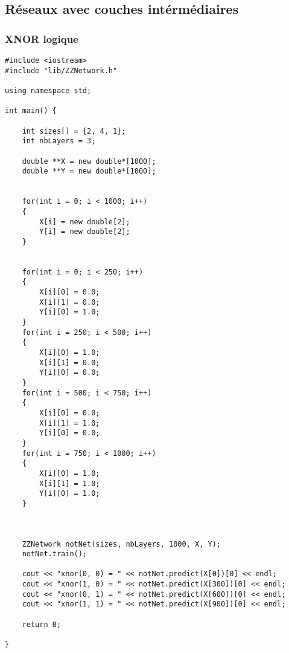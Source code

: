 \subsection{Réseaux avec couches intérmédiaires}

\subsubsection{XNOR logique}
\begin{verbatim}
#include <iostream>
#include "lib/ZZNetwork.h"

using namespace std;

int main() {

	int sizes[] = {2, 4, 1};
	int nbLayers = 3;

	double **X = new double*[1000];
	double **Y = new double*[1000];


	for(int i = 0; i < 1000; i++)
	{
		X[i] = new double[2];
		Y[i] = new double[2];
	}


	for(int i = 0; i < 250; i++)
	{
		X[i][0] = 0.0;
		X[i][1] = 0.0;
		Y[i][0] = 1.0;
	}
	for(int i = 250; i < 500; i++)
	{
		X[i][0] = 1.0;
		X[i][1] = 0.0;
		Y[i][0] = 0.0;
	}
	for(int i = 500; i < 750; i++)
	{
		X[i][0] = 0.0;
		X[i][1] = 1.0;
		Y[i][0] = 0.0;
	}
	for(int i = 750; i < 1000; i++)
	{
		X[i][0] = 1.0;
		X[i][1] = 1.0;
		Y[i][0] = 1.0;
	}



	ZZNetwork notNet(sizes, nbLayers, 1000, X, Y);
	notNet.train();

	cout << "xnor(0, 0) = " << notNet.predict(X[0])[0] << endl;
	cout << "xnor(1, 0) = " << notNet.predict(X[300])[0] << endl;
	cout << "xnor(0, 1) = " << notNet.predict(X[600])[0] << endl;
	cout << "xnor(1, 1) = " << notNet.predict(X[900])[0] << endl;

    return 0;

}
\end{verbatim}

